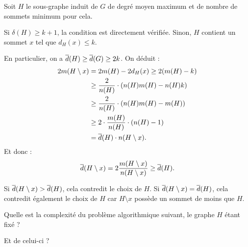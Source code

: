 \begin{td-sol}
    Soit \(H\) le sous-graphe induit de \(G\) de degré moyen maximum et de nombre de sommets minimum pour cela.

    Si \(\delta(H) \geq k + 1\), la condition est directement vérifiée. Sinon, \(H\) contient un sommet \(x\) tel que \(d_H(x) \leq k\).

    En particulier, on a \(\overline{d}(H) \geq \overline{d}(G) \geq 2k\). On déduit :
    \begin{equation*}
        \begin{aligned}
            2m(H \setminus x) &= 2m(H) - 2d_H(x) \geq 2(m(H) - k) \\
            &\geq \frac{2}{n(H)} \cdot \left(n(H) m(H) - n(H) k\right) \\
            &\geq \frac{2}{n(H)} \cdot \left(n(H) m(H) - m(H)\right) \\
            &\geq 2 \cdot \frac{m(H)}{n(H)} \cdot (n(H) - 1) \\
            &= \overline{d}(H) \cdot n(H \setminus x).
        \end{aligned}
    \end{equation*}
    Et donc :
    \begin{equation*}
        \overline{d}(H \setminus x) = 2 \frac{m(H \setminus x)}{n(H \setminus x)} \geq \overline{d}(H).
    \end{equation*}

    Si \(\overline{d}(H \setminus x) > \overline{d}(H)\), cela contredit le choix de \(H\).
    Si \(\overline{d}(H \setminus x) = \overline{d}(H)\), cela contredit également le choix de \(H\) car \(H \setminus x\) possède un sommet de moins que \(H\).
\end{td-sol}

\begin{td-exo}
    Quelle est la complexité du problème algorithmique suivant, le graphe \(H\) étant fixé ?

    Et de celui-ci ?
\end{td-exo}